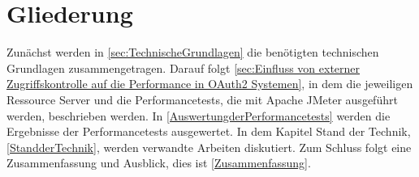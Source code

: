 %
%
\section{Gliederung}
\label{sec:intro:structure}
Zunächst werden in \autoref{sec:TechnischeGrundlagen} die benötigten technischen Grundlagen zusammengetragen. Darauf folgt \autoref{sec:Einfluss von externer Zugriffskontrolle auf die Performance in OAuth2 Systemen}, in dem die jeweiligen Ressource Server und die Performancetests, die mit Apache JMeter ausgeführt werden, beschrieben werden. In \autoref{AuswertungderPerformancetests} werden die Ergebnisse der Performancetests ausgewertet. In dem Kapitel Stand der Technik, \autoref{StandderTechnik}, werden verwandte Arbeiten diskutiert. Zum Schluss folgt eine Zusammenfassung und Ausblick, dies ist \autoref{Zusammenfassung}. 
